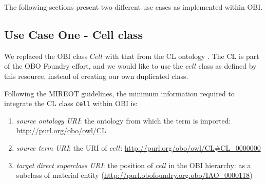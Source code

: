 \documentclass[a4paper,10pt,twocolumn]{article}
\begin{document}
The following sections present two different use cases as implemented within OBI.


\subsection*{Use Case One - Cell class}

We replaced the \ac{OBI} class $Cell$ with that from the \ac{CL} ontology \cite{RefWorks:1559}. %
The \ac{CL} is part of the \ac{OBO} Foundry effort, and we would like to use the $cell$ class as defined by this resource, instead of creating our own duplicated class.












Following the MIREOT guidelines, the minimum information required to integrate the \ac{CL} class \texttt{cell} within OBI is:  

\begin{enumerate}
\item \textit{source ontology URI}: the ontology from which the term is imported: \url{http://purl.org/obo/owl/CL}
\item \textit{source term URI}: the URI of $cell$: \url{http://purl.org/obo/owl/CL#CL_0000000}
\item \textit{target direct superclass URI}: the position of $cell$ in the OBI hierarchy: as a subclass of material entity (\url{http://purl.obofoundry.org.obo/IAO_0000118}) %



\end{enumerate}
\end{document}
